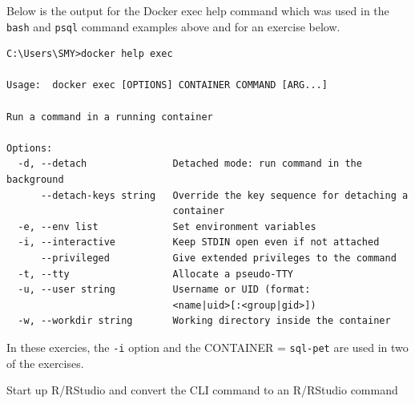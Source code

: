 \documentclass[]{book}
\theoremstyle{definition}
\theoremstyle{definition}
\theoremstyle{definition}
\theoremstyle{remark}
\begin{document}
Below is the output for the Docker exec help command which was used in
the \texttt{bash} and \texttt{psql} command examples above and for an
exercise below.

\begin{verbatim}
C:\Users\SMY>docker help exec

Usage:  docker exec [OPTIONS] CONTAINER COMMAND [ARG...]

Run a command in a running container

Options:
  -d, --detach               Detached mode: run command in the background
      --detach-keys string   Override the key sequence for detaching a
                             container
  -e, --env list             Set environment variables
  -i, --interactive          Keep STDIN open even if not attached
      --privileged           Give extended privileges to the command
  -t, --tty                  Allocate a pseudo-TTY
  -u, --user string          Username or UID (format:
                             <name|uid>[:<group|gid>])
  -w, --workdir string       Working directory inside the container
\end{verbatim}

In these exercies, the \texttt{-i} option and the CONTAINER =
\texttt{sql-pet} are used in two of the exercises.

Start up R/RStudio and convert the CLI command to an R/RStudio command
\end{document}
